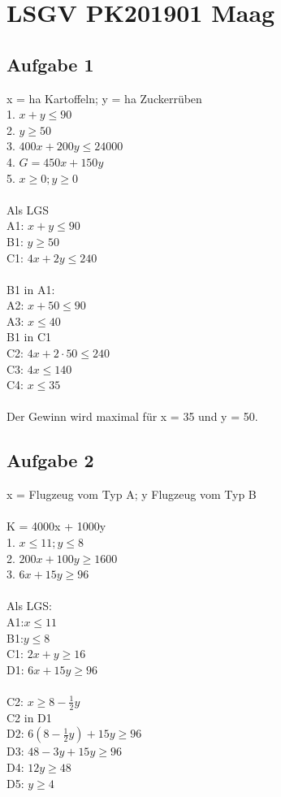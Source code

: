 \documentclass{article}
\begin{document}
	\section*{LSGV PK201901 Maag}
	\subsection*{Aufgabe 1}
	x = ha Kartoffeln; y = ha Zuckerrüben \\
	1. $x + y \leq 90$ \\
	2. $y \geq 50$ \\
	3. $400x + 200y \leq 24000$ \\
	4. $G = 450x + 150y$ \\
	5. $x \geq 0; y \geq 0$ \\ \\
	Als LGS \\
	A1: $x + y \leq 90$ \\
	B1: $y \geq 50$ \\
	C1: $4x + 2y \leq 240$ \\ \\
	B1 in A1: \\
	A2: $x + 50 \leq 90$ \\
	A3: $x \leq 40$ \\
	B1 in C1 \\
	C2: $4x + 2 \cdot 50 \leq 240$ \\
	C3: $4x \leq 140$ \\
	C4: $x  \leq 35$ \\ \\
	Der Gewinn wird maximal für x = 35 und y = 50.
	\subsection*{Aufgabe 2}
	x = Flugzeug vom Typ A; y Flugzeug vom Typ B \\
	\\
	K = 4000x + 1000y \\
	1. $x \leq 11; y \leq 8$ \\
	2. $200x + 100y \geq 1600$ \\
	3. $6x + 15y \geq 96$ \\ \\
	Als LGS: \\
	A1:$x \leq 11$ \\
	B1:$y  \leq 8$ \\
	C1: $2x + y \geq 16$ \\
	D1: $6x + 15y \geq 96$ \\ \\
	C2: $x\geq 8 - \frac{1}{2}y$ \\
	C2 in D1 \\
	D2: $6(8 - \frac{1}{2}y) + 15y \geq 96$ \\
	D3: $48 - 3y + 15y \geq 96$ \\
	D4: $12y \geq 48$ \\
	D5: $y \geq 4$ \\
	
\end{document}
